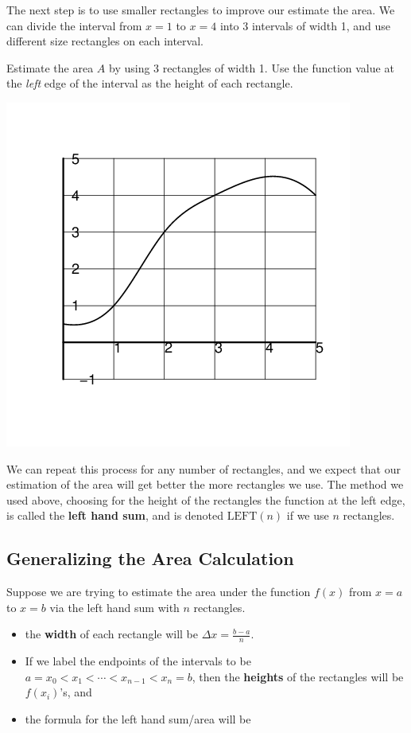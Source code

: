 \newpage The next step is to use smaller rectangles to improve our
estimate the area.  We can divide the interval from $x = 1$ to $x = 4$
into 3 intervals of width 1, and use different size rectangles on each
interval.



\problem Estimate the area $A$ by using 3 rectangles of width 1.
  Use the function value at the {\em left} edge of the interval as the
  height of each rectangle.

\hfill \includegraphics[width=0.43\linewidth]{graphics/notes_04_graph06}

\newpage

We can repeat this process for any number of rectangles, and we expect
that our estimation of the area will get better the more rectangles we
use.  The method we used above, choosing for the height of the
rectangles the function at the left edge, is called the {\bf left hand
  sum}, and is denoted $\mbox{LEFT}(n)$ if we use $n$ rectangles.

\newpage

\subsection*{Generalizing the Area Calculation}

Suppose we are trying to estimate the area under the function $f(x)$
from $x = a$ to $x = b$ via the left hand sum with $n$ rectangles.
\begin{itemize}
\item the {\bf width} of each rectangle will be $\Delta x =
\displaystyle\frac{b-a}{n}$.  
\item If we label the endpoints of the intervals to be
  $a = x_{0} < x_{1} < \cdots < x_{n-1} < x_{n} = b$, then the {\bf
    heights} of the rectangles will be $f(x_{i})$'s, and
\item the formula for the left hand sum/area will be
\end{itemize}

